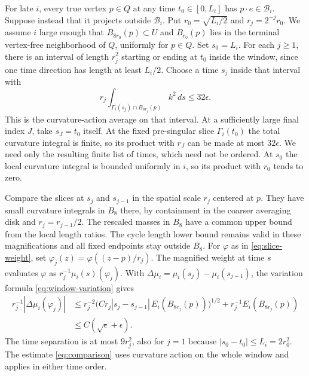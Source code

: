 For late \(i\), every true vertex \(p\in Q\) at any time \(t_0\in[0,L_i]\) has \(p\cdot e\in\mathcal B_i\). Suppose instead that it projects outside \(\mathcal B_i\). Put \(r_0=\sqrt{L_i/2}\) and \(r_j=2^{-j}r_0\). We assume \(i\) large enough that \(B_{8r_0}(p)\subset U\) and \(B_{r_0}(p)\) lies in the terminal vertex-free neighborhood of \(Q\), uniformly for \(p\in Q\). Set \(s_0=L_i\). For each \(j\ge1\), there is an interval of length \(r_j^2\) starting or ending at \(t_0\) inside the window, since one time direction has length at least \(L_i/2\). Choose a time \(s_j\) inside that interval with \[
r_j\int_{\Gamma_i(s_j)\cap B_{8r_j}(p)} k^2\,ds\le 32\epsilon .
\] This is the curvature-action average on that interval. At a sufficiently large final index \(J\), take \(s_J=t_0\) itself. At the fixed pre-singular slice \(\Gamma_i(t_0)\) the total curvature integral is finite, so its product with \(r_J\) can be made at most \(32\epsilon\). We need only the resulting finite list of times, which need not be ordered. At \(s_0\) the local curvature integral is bounded uniformly in \(i\), so its product with \(r_0\) tends to zero.

Compare the slices at \(s_j\) and \(s_{j-1}\) in the spatial scale \(r_j\) centered at \(p\). They have small curvature integrals in \(B_8\) there, by containment in the coarser averaging disk and \(r_j=r_{j-1}/2\). The rescaled masses in \(B_8\) have a common upper bound from the local length ratios. The cycle length lower bound remains valid in these magnifications and all fixed endpoints stay outside \(B_8\). For \(\varphi\) as in \eqref{eq:slice-weight}, set \(\varphi_j(z)=\varphi((z-p)/r_j)\). The magnified weight at time \(s\) evaluates \(\varphi\) as \(r_j^{-1}\mu_i(s)(\varphi_j)\). With \(\Delta\mu_i=\mu_i(s_j)-\mu_i(s_{j-1})\), the variation formula \eqref{eq:window-variation} gives \begin{equation}\label{eq:comparison}
\begin{split}
r_j^{-1}\left|\Delta\mu_i(\varphi_j)\right|
&\le r_j^{-2}\big(Cr_j|s_j-s_{j-1}|\,E_i(B_{8r_j}(p))\big)^{1/2}
        +r_j^{-1}E_i(B_{8r_j}(p))\\
&\le C(\sqrt\epsilon+\epsilon).
\end{split}
\end{equation} The time separation is at most \(9r_j^2\), also for \(j=1\) because \(|s_0-t_0|\le L_i=2r_0^2\). The estimate \eqref{eq:comparison} uses curvature action on the whole window and applies in either time order.

